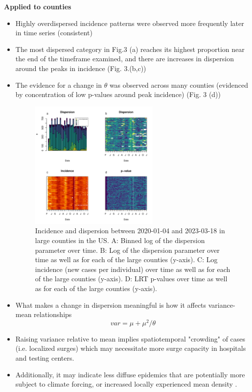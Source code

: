 \documentclass{beamer}
\begin{document}
\begin{frame}{\textbf{Applied to counties}}
	\begin{itemize}[<+-| alert@+>]
		\item Highly overdispersed incidence patterns were observed more frequently later in time series (consistent) 
		\item The most dispersed category in Fig.3 (a) reaches its highest proportion near the end of the timeframe examined, and there are increases in dispersion around the peaks in incidence  (Fig. 3.(b,c))
		\item The evidence for a change in \begin{math}\theta\end{math} was observed across many counties (evidenced by concentration of low p-values around peak incidence) (Fig. 3 (d))
		\begin{figure}[!h]
			\includegraphics[width=0.6\textwidth]{fig2}
			\caption{
				Incidence and dispersion between 2020-01-04 and 2023-03-18 in large counties in the US. A: Binned log of the dispersion parameter over time. B: Log of the dispersion parameter over time as well as for each of the large counties (y-axis). C: Log incidence (new cases per individual) over time as well as for each of the large counties (y-axis). D: LRT p-values over time as well as for each of the large counties (y-axis).
			}
			\label{fig2}
		\end{figure}
		\item What makes a change in dispersion meaningful is how it affects variance-mean relationships
		\begin{equation}
			var = \mu + \mu^2/\theta  
		\end{equation}
		\item Raising variance relative to mean implies spatiotemporal "crowding" of cases (i.e. localized surges) which may necessitate more surge capacity in hospitals and testing centers. 
		\item Additionally, it may indicate less diffuse epidemics that are potentially more subject to climate forcing\cite{dalziel_urbanization_2018}, or increased locally experienced mean density \cite{lloyd_mean_1967}. 
	\end{itemize}
\end{frame}
\end{document}
